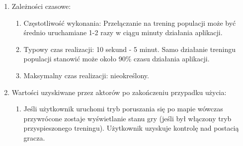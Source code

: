 \begin{par}
\begin{itemize}
\begin{enumerate}
\begin{enumerate}
		\end{enumerate}
	\item Zależności czasowe:
		\begin{enumerate}
		\item Częstotliwość wykonania: Przełączanie na trening populacji może być średnio uruchamiane 1-2 razy w ciągu minuty działania aplikacji. 
		\item Typowy czas realizacji: 10 sekund - 5 minut. Samo działanie treningu populacji stanowić może około 90\% czasu działania aplikacji.
		\item Maksymalny czas realizacji: nieokreślony.
		\end{enumerate}
	\item Wartości uzyskiwane przez aktorów po zakończeniu przypadku użycia:
		\begin{enumerate}
		\item Jeśli użytkownik uruchomi tryb poruszania się po mapie wówczas przywrócone zostaje wyświetlanie stanu gry (jeśli był włączony tryb przyspieszonego treningu). Użytkownik uzyskuje kontrolę nad postacią gracza.
		\end{enumerate}
	\end{enumerate}
	

\end{itemize}
\end{par}
